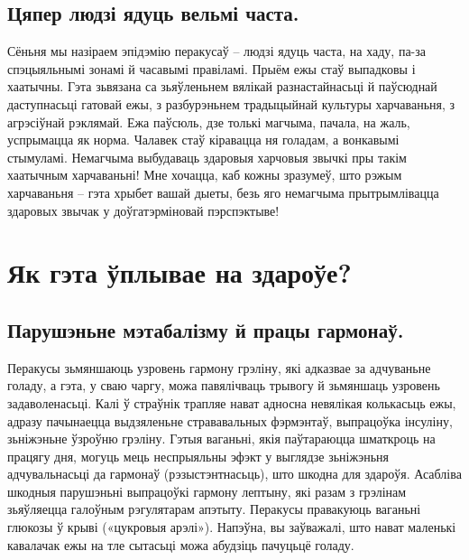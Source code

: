\subsection{Цяпер людзі ядуць вельмі часта.}
Сёньня мы назіраем эпідэмію перакусаў – людзі ядуць часта, на хаду, па-за спэцыяльнымі зонамі й часавымі правіламі. Прыём ежы стаў выпадковы і хаатычны. Гэта зьвязана са зьяўленьнем вялікай разнастайнасьці й паўсюднай даступнасьці гатовай ежы, з разбурэньнем традыцыйнай культуры харчаваньня, з агрэсіўнай рэклямай. Ежа паўсюль, дзе толькі магчыма, пачала, на жаль, успрымацца як норма. Чалавек стаў кіравацца ня голадам, а вонкавымі стымуламі. Немагчыма выбудаваць здаровыя харчовыя звычкі пры такім хаатычным харчаваньні! Мне хочацца, каб кожны зразумеў, што рэжым харчаваньня – гэта хрыбет вашай дыеты, безь яго немагчыма прытрымлівацца здаровых звычак у доўгатэрміновай пэрспэктыве!

\section{Як гэта ўплывае на здароўе?}

\subsection{Парушэньне мэтабалізму й працы гармонаў.}
Перакусы зьмяншаюць узровень гармону грэліну, які адказвае за адчуваньне голаду, а гэта, у сваю чаргу, можа павялічваць трывогу й зьмяншаць узровень задаволенасьці. Калі ў страўнік трапляе нават адносна невялікая колькасьць ежы, адразу пачынаецца выдзяленьне стрававальных фэрмэнтаў, выпрацоўка інсуліну, зьніжэньне ўзроўню грэліну. Гэтыя ваганьні, якія паўтараюцца шматкроць на працягу дня, могуць мець неспрыяльны эфэкт у выглядзе зьніжэньня адчувальнасьці да гармонаў (рэзыстэнтнасьць), што шкодна для здароўя. Асабліва шкодныя парушэньні выпрацоўкі гармону лептыну, які разам з грэлінам зьяўляецца галоўным рэгулятарам апэтыту. Перакусы правакуюць ваганьні глюкозы ў крыві («цукровыя арэлі»). Напэўна, вы заўважалі, што нават маленькі кавалачак ежы на тле сытасьці можа абудзіць пачуцьцё голаду.

